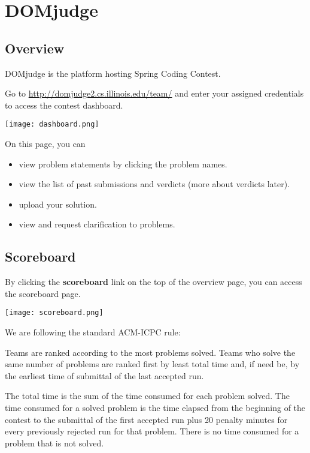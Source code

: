 \documentclass {article}
\begin{document}
\tableofcontents

\newpage
\section{DOMjudge}
\subsection{Overview}
DOMjudge is the platform hosting Spring Coding Contest.

Go to \url{http://domjudge2.cs.illinois.edu/team/} and enter your assigned 
credentials to access the contest dashboard.

\begin{center}
    \texttt{[image: dashboard.png]}
\end{center}

On this page, you can
\begin{itemize}
\item view problem statements by clicking the problem names.
\item view the list of past submissions and verdicts (more about verdicts
      later).
\item upload your solution.
\item view and request clarification to problems.
\end{itemize}

\subsection{Scoreboard}
By clicking the \textbf{scoreboard} link on the top of the overview page, you
can access the scoreboard page. 

\begin{center}
    \texttt{[image: scoreboard.png]}
\end{center}

We are following the standard ACM-ICPC rule:

Teams are ranked according to the most problems solved. 
Teams who solve the same number of problems are ranked first by least total 
time and, if need be, by the earliest time of submittal of the last accepted 
run.

The total time is the sum of the time consumed for each problem solved. 
The time consumed for a solved problem is the time elapsed from the beginning
of the contest to the submittal of the first accepted run plus 20 penalty 
minutes for every previously rejected run for that problem. 
There is no time consumed for a problem that is not solved.
\end{document}
